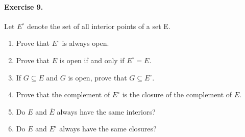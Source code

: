 \documentclass[11pt]{report}
\theoremstyle{remark}
\begin{document}
    \paragraph{Exercise 9.} Let $E^\circ$ denote the set of all interior points of a
    set E.
    \begin{enumerate}
        \itemsep0em
        \item Prove that $E^\circ$ is always open.
        \item Prove that $E$ is open if and only if $E^\circ = E$.
        \item If $G \subseteq E$ and $G$ is open, prove that $G \subseteq E^\circ$.
        \item Prove that the complement of $E^\circ$ is the closure of the
        complement of $E$.
        \item Do $E$ and $\overline{E}$ always have the same interiors?
        \item Do $E$ and $E^\circ$ always have the same closures?
    \end{enumerate}
\end{document}
